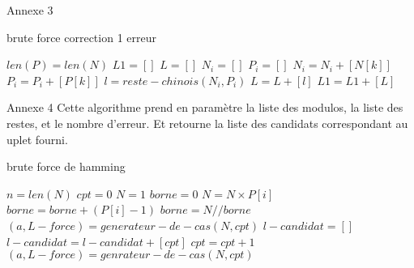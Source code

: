 \documentclass[a4paper, 11pt]{report}
\begin{document}
\begin{appendices}
    Annexe 3
    \begin{algorithm}
        \caption{brute force correction 1 erreur}
        \begin{algorithmic}
            \REQUIRE $len(P)=len(N)$
            \STATE $L1=[]$
            \STATE $L=[]$
            \STATE $N_i=[]$
            \STATE $P_i=[]$
            \STATE $N_i=N_i+[N[k]]$
            \STATE $P_i=P_i+[P[k]]$
            \ENDIF
            \ENDFOR
            \STATE $l=reste-chinois(N_i,P_i)$
            \STATE $L=L+[l]$
            \ENDFOR
            \STATE $L1=L1+[L]$
            \ENDFOR
        \end{algorithmic}
    \end{algorithm}
\end{appendices}

\newpage

\begin{appendices}
    Annexe 4 \newline
    Cette algorithme prend en paramètre la liste des modulos, la liste des restes, et le nombre d'erreur. Et retourne la liste des candidats correspondant au uplet fourni.
    \begin{algorithm}
        \caption{brute force de hamming}
        \begin{algorithmic}
            \STATE $n=len(N)$
            \STATE $cpt=0 $
            \STATE $N=1$
            \STATE $borne=0$
            \STATE $N=N\times P[i]$
            \STATE $borne=borne+ (P[i]-1)$
            \ENDFOR
            \STATE $borne=N//borne$
            \STATE $(a,L-force)= generateur-de-cas(N,cpt) $
            \STATE $l-candidat=[]$
            \STATE $l-candidat = l-candidat+[cpt]$
            \ENDIF
            \STATE $cpt=cpt+1$
            \STATE $(a,L-force)=genrateur-de-cas(N,cpt)$
            \ENDWHILE
        \end{algorithmic}
    \end{algorithm}
\end{appendices}

\newpage
\end{document}
